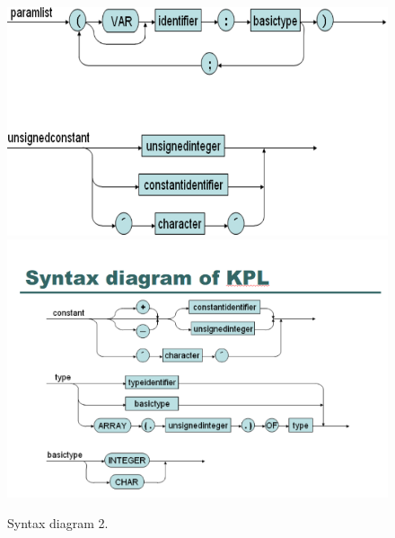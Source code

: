 \documentclass[12pt, a4paper]{report}
\begin{document}
				\begin{figure}[hp]
					\includegraphics[width=\linewidth]{syn3.png}
					\includegraphics[width=\linewidth]{syn4.png}
					
					\caption{Syntax diagram 2.}
					\label{fig:syn2}
				\end{figure}
\end{document}
